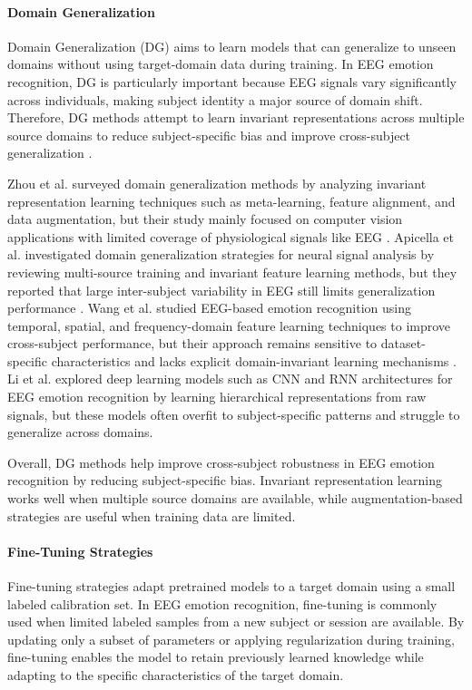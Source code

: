 \documentclass{WileyMSP-template}
\begin{document}
\paragraph{Domain Generalization}
Domain Generalization (DG) aims to learn models that can generalize to unseen domains without using target-domain data during training. In EEG emotion recognition, DG is particularly important because EEG signals vary significantly across individuals, making subject identity a major source of domain shift. Therefore, DG methods attempt to learn invariant representations across multiple source domains to reduce subject-specific bias and improve cross-subject generalization \cite{zhou2022dgsurvey,apicella2024neucom_systematic}.

Zhou et al. \cite{zhou2022dgsurvey} surveyed domain generalization methods by analyzing invariant representation learning techniques such as meta-learning, feature alignment, and data augmentation, but their study mainly focused on computer vision applications with limited coverage of physiological signals like EEG . Apicella et al. \cite{apicella2024neucom_systematic} investigated domain generalization strategies for neural signal analysis by reviewing multi-source training and invariant feature learning methods, but they reported that large inter-subject variability in EEG still limits generalization performance . Wang et al. \cite{wang2024researchprogress} studied EEG-based emotion recognition using temporal, spatial, and frequency-domain feature learning techniques to improve cross-subject performance, but their approach remains sensitive to dataset-specific characteristics and lacks explicit domain-invariant learning mechanisms . Li et al. \cite{li2022tutorial} explored deep learning models such as CNN and RNN architectures for EEG emotion recognition by learning hierarchical representations from raw signals, but these models often overfit to subject-specific patterns and struggle to generalize across domains. 

Overall, DG methods help improve cross-subject robustness in EEG emotion recognition by reducing subject-specific bias. Invariant representation learning works well when multiple source domains are available, while augmentation-based strategies are useful when training data are limited.

\paragraph{Fine-Tuning Strategies}
Fine-tuning strategies adapt pretrained models to a target domain using a small labeled calibration set. In EEG emotion recognition, fine-tuning is commonly used when limited labeled samples from a new subject or session are available. By updating only a subset of parameters or applying regularization during training, fine-tuning enables the model to retain previously learned knowledge while adapting to the specific characteristics of the target domain.
\end{document}

